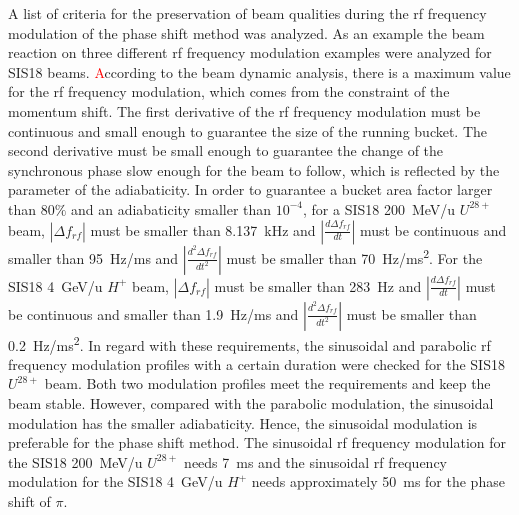 A list of criteria for the preservation of beam qualities during the rf frequency modulation of the phase shift method was analyzed. As an example the beam reaction on three different rf frequency modulation examples were analyzed for SIS18 beams. \textcolor{red}According to the beam dynamic analysis, there is a maximum value for the rf frequency modulation, which comes from the constraint of the momentum shift. The first derivative of the rf frequency modulation must be continuous and small enough to guarantee the size of the running bucket. The second derivative must be small enough to guarantee the change of the synchronous phase slow enough for the beam to follow, which is reflected by the parameter of the adiabaticity. In order to guarantee a bucket area factor larger than $80\%$ and an adiabaticity smaller than $10^{-4}$, for a SIS18 \SI{200}{MeV/u} $U^{28+}$ beam, $|\Delta f_{\mathit{rf}}|$ must be smaller than \SI{8.137}{kHz} and $|\frac{d\Delta f_{\mathit{rf}}}{dt}|$ must be continuous and smaller than \SI{95}{Hz/ms} and $|\frac{d^2\Delta f_{\mathit{rf}}}{dt^2}|$ must be smaller than \SI{70}{Hz/ms^2}. For the SIS18 \SI{4}{GeV/u} $H^{+}$ beam, $|\Delta f_{\mathit{rf}}|$ must be smaller than \SI{283}{Hz} and $|\frac{d\Delta f_{\mathit{rf}}}{dt}|$ must be continuous and smaller than \SI{1.9}{Hz/ms} and $|\frac{d^2\Delta f_{\mathit{rf}}}{dt^2}|$ must be smaller than \SI{0.2}{Hz/ms^2}.  In regard with these requirements, the sinusoidal and parabolic rf frequency modulation profiles with a certain duration were checked for the SIS18 $U^{28+}$ beam. Both two modulation profiles meet the requirements and keep the beam stable. However, compared with the parabolic modulation, the sinusoidal modulation has the smaller adiabaticity. Hence, the sinusoidal modulation is preferable for the phase shift method. The sinusoidal rf frequency modulation for the SIS18 \SI{200}{MeV/u} $U^{28+}$ needs \SI{7}{\ms} and the sinusoidal rf frequency modulation for the SIS18 \SI{4}{GeV/u} $H^{+}$ needs approximately \SI{50}{\ms} for the phase shift of $\pi$. 

